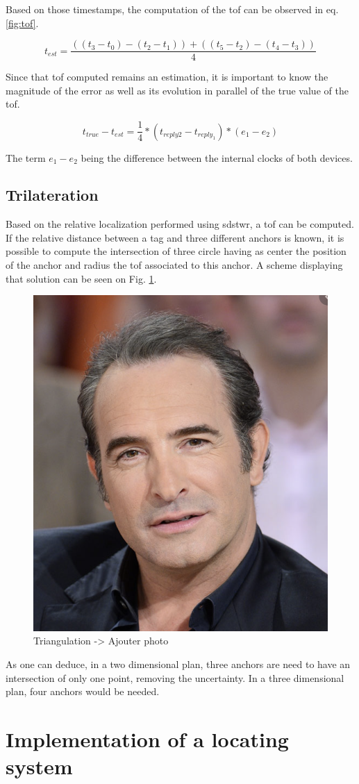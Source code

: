 Based on those timestamps, the computation of the \gls{tof} can be observed in eq. \ref{fig:tof}.

\begin{equation}
	t_{est} = \frac{((t_3 - t_0) - (t_2 - t_1)) + ((t_5 - t_2) - (t_4 - t_3))}{4}
\label{fig:tof}
\end{equation}

Since that \gls{tof} computed remains an estimation, it is important to know the magnitude of the error as well as its evolution in parallel of the true value of the \gls{tof}.

\begin{equation}
	t_{true} - t_{est} = \frac{1}{4}*(t_{reply2} - t_{reply_1})*(e_1 - e_2)
\end{equation}

The term $e_1 - e_2$ being the difference between the internal clocks of both devices. \cite{dalce2011comparison}

\subsection{Trilateration}

Based on the relative localization performed using \gls{sdstwr}, a \gls{tof} can be computed. If the relative distance between a tag and three different anchors is known, it is possible to compute the intersection of three circle having as center the position of the anchor and radius the \gls{tof} associated to this anchor. A scheme displaying that solution can be seen on Fig. \ref{fig:triangulation}.

\begin{figure}[H]
\centering
\includegraphics[width=.2\linewidth]{Images/Temporary_pic.png}
\caption{Triangulation -> Ajouter photo}
\label{fig:triangulation}
\end{figure}

As one can deduce, in a two dimensional  plan, three anchors are need to have an intersection of only one point, removing the uncertainty. In a three dimensional plan, four anchors would be needed.

\section{Implementation of a locating system}

